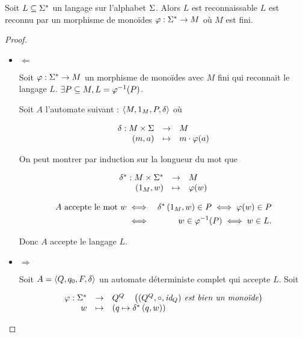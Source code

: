 \begin{prop}
	Soit $L \subseteq \Sigma^{*}$ un langage sur l'alphabet $\Sigma$. Alors $L$ est reconnaissable \ssi $L$ est reconnu par un morphisme de monoïdes $\varphi : \Sigma^{*} \to M$ où $M$ est fini.
\end{prop}


\begin{proof}
	\begin{itemize}
		\item $\Leftarrow$

		      Soit $\varphi : \Sigma^{*} \to M$ un morphisme de monoïdes avec $M$ fini qui reconnait le langage $L$.
		      $\exists P \subseteq M, L = \varphi^{-1} (P)$.

		      Soit $A$ l'automate suivant : $\langle M, 1_M, P, \delta \rangle$ où

		      $$ \begin{array}{rcl}
				      \delta : M \times \Sigma & \to     & M                \\
				      (m,a)                       & \mapsto & m \cdot \varphi (a)
			      \end{array} $$

		      On peut montrer par induction sur la longueur du mot que

		      $$ \begin{array}{rcl}
				      \delta ^* : M \times \Sigma^{*} & \to     & M        \\
				      (1_M, w)                   & \mapsto & \varphi (w)
			      \end{array} $$

		      
		      \begin{eqnarray*}
			      A \text{ accepte le mot } w &\iff&  \delta^{*} \left(1_M,w\right) \in P \iff \varphi (w) \in P \\
			      &\iff&  w \in \varphi^{-1}(P) \iff w \in L.
		      \end{eqnarray*}

		      Donc $A$ accepte le langage $L$.


		\item $\Rightarrow$

		      Soit $A = \langle Q, q_0, F, \delta \rangle$ un automate déterministe complet qui accepte $L$.
		      Soit

		      $$ \begin{array}{rcl}
				      \varphi : \Sigma^{*} & \to     & Q^Q        \quad\left(\textit{$(Q^Q, \circ,\text{id}_Q) $ est bien un monoïde}\right) \\
				      w  & \mapsto & ( q \mapsto \delta^{*} \left(q,w\right) )
			      \end{array} $$


\end{itemize}
\end{proof}
